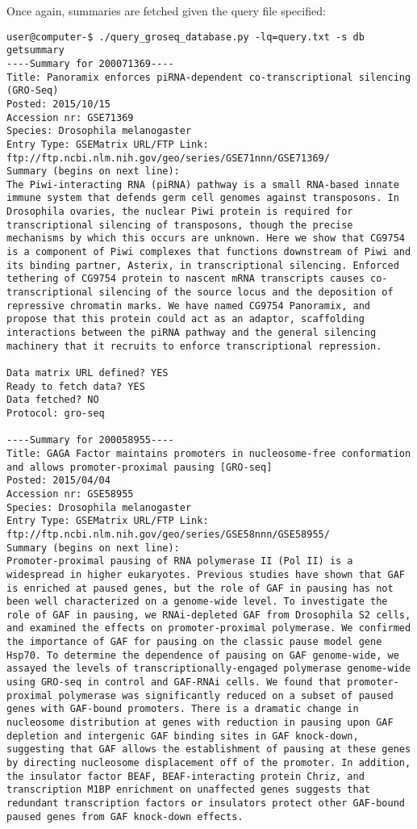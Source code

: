 \documentclass[12pt,letterpaper]{article}
\begin{document}
Once again, summaries are fetched given the query file specified:
\begin{verbatim}
user@computer-$ ./query_groseq_database.py -lq=query.txt -s db getsummary
----Summary for 200071369----
Title: Panoramix enforces piRNA-dependent co-transcriptional silencing (GRO-Seq)
Posted: 2015/10/15
Accession nr: GSE71369
Species: Drosophila melanogaster
Entry Type: GSEMatrix URL/FTP Link: ftp://ftp.ncbi.nlm.nih.gov/geo/series/GSE71nnn/GSE71369/
Summary (begins on next line):
The Piwi-interacting RNA (piRNA) pathway is a small RNA-based innate immune system that defends germ cell genomes against transposons. In Drosophila ovaries, the nuclear Piwi protein is required for transcriptional silencing of transposons, though the precise mechanisms by which this occurs are unknown. Here we show that CG9754 is a component of Piwi complexes that functions downstream of Piwi and its binding partner, Asterix, in transcriptional silencing. Enforced tethering of CG9754 protein to nascent mRNA transcripts causes co-transcriptional silencing of the source locus and the deposition of repressive chromatin marks. We have named CG9754 Panoramix, and propose that this protein could act as an adaptor, scaffolding interactions between the piRNA pathway and the general silencing machinery that it recruits to enforce transcriptional repression.

Data matrix URL defined? YES
Ready to fetch data? YES
Data fetched? NO
Protocol: gro-seq

----Summary for 200058955----
Title: GAGA Factor maintains promoters in nucleosome-free conformation and allows promoter-proximal pausing [GRO-seq]
Posted: 2015/04/04
Accession nr: GSE58955
Species: Drosophila melanogaster
Entry Type: GSEMatrix URL/FTP Link: ftp://ftp.ncbi.nlm.nih.gov/geo/series/GSE58nnn/GSE58955/
Summary (begins on next line):
Promoter-proximal pausing of RNA polymerase II (Pol II) is a widespread in higher eukaryotes. Previous studies have shown that GAF is enriched at paused genes, but the role of GAF in pausing has not been well characterized on a genome-wide level. To investigate the role of GAF in pausing, we RNAi-depleted GAF from Drosophila S2 cells, and examined the effects on promoter-proximal polymerase. We confirmed the importance of GAF for pausing on the classic pause model gene Hsp70. To determine the dependence of pausing on GAF genome-wide, we assayed the levels of transcriptionally-engaged polymerase genome-wide using GRO-seq in control and GAF-RNAi cells. We found that promoter-proximal polymerase was significantly reduced on a subset of paused genes with GAF-bound promoters. There is a dramatic change in nucleosome distribution at genes with reduction in pausing upon GAF depletion and intergenic GAF binding sites in GAF knock-down, suggesting that GAF allows the establishment of pausing at these genes by directing nucleosome displacement off of the promoter. In addition, the insulator factor BEAF, BEAF-interacting protein Chriz, and transcription M1BP enrichment on unaffected genes suggests that redundant transcription factors or insulators protect other GAF-bound paused genes from GAF knock-down effects.


\end{verbatim}
\end{document}
